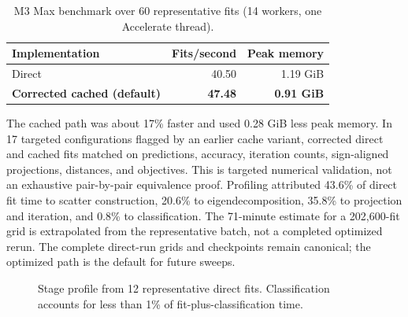 \documentclass{article}
\begin{document}
\begin{table}[H]
\centering
\small
\caption{M3 Max benchmark over 60 representative fits (14 workers, one Accelerate thread).}
\label{tab:runtime}
\begin{tabular}{lrr}
\toprule
Implementation & Fits/second & Peak memory\\
\midrule
Direct & 40.50 & 1.19 GiB\\
\textbf{Corrected cached (default)} & \textbf{47.48} & \textbf{0.91 GiB}\\
\bottomrule
\end{tabular}
\end{table}

The cached path was about 17\% faster and used 0.28 GiB less peak memory. In 17 targeted configurations flagged by an earlier cache variant, corrected direct and cached fits matched on predictions, accuracy, iteration counts, sign-aligned projections, distances, and objectives. This is targeted numerical validation, not an exhaustive pair-by-pair equivalence proof. Profiling attributed 43.6\% of direct fit time to scatter construction, 20.6\% to eigendecomposition, 35.8\% to projection and iteration, and 0.8\% to classification. The 71-minute estimate for a 202,600-fit grid is extrapolated from the representative batch, not a completed optimized rerun. The complete direct-run grids and checkpoints remain canonical; the optimized path is the default for future sweeps.

\begin{figure}[H]
\centering
{}
\caption{Stage profile from 12 representative direct fits. Classification accounts for less than 1\% of fit-plus-classification time.}
\label{fig:profile}
\end{figure}
\end{document}
